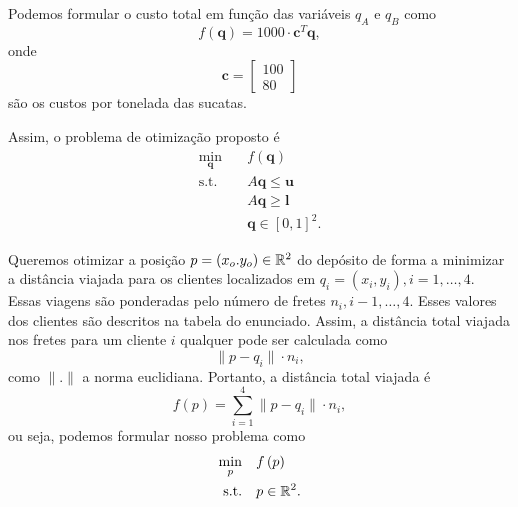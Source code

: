 \documentclass[a4paper]{report}
\begin{document}
Podemos formular o custo total em função das variáveis $q_A$ e $q_B$ como \[
    f\left( \bm{q} \right) = 1000\cdot \bm{c}^{T} \bm{q}
,\] onde \[
\bm{c} = \begin{bmatrix} 100 \\ 80 \end{bmatrix} 
\] são os custos por tonelada das sucatas.

Assim, o problema de otimização proposto é
\begin{align*}
    \min_{\bm{q}} \quad & f\left( \bm{q} \right)  \\
    \textrm{s.t.} \quad & A\bm{q}\le \bm{u} \\
      & A\bm{q}\ge \bm{l} \\
      & \bm{q} \in \left[ 0,1 \right] ^{2}
.\end{align*}


Queremos otimizar a posição $p = (x_o. y_o) \in \mathbb{R}^{2}$ do depósito de forma a minimizar a distância viajada para os clientes localizados em $q_i = \left( x_i, y_i \right), i=1,\ldots,4$. Essas viagens são ponderadas pelo número de fretes $n_i, i-1,\ldots,4$. Esses valores dos clientes são descritos na tabela do enunciado. Assim, a distância total viajada nos fretes para um cliente $i$ qualquer pode ser calculada como \[
\|p - q_i\|\cdot n_i
,\] como $\|.\|$ a norma euclidiana. Portanto, a distância total viajada é \[
f(p) = \sum_{i=1}^{4} \|p - q_i\|\cdot n_i
,\] ou seja, podemos formular nosso problema como
\begin{align*}
    \min_{p} \quad & f\left( p \right)  \\
    \textrm{s.t.} \quad & p \in \mathbb{R}^{2}
.\end{align*}
\end{document}
